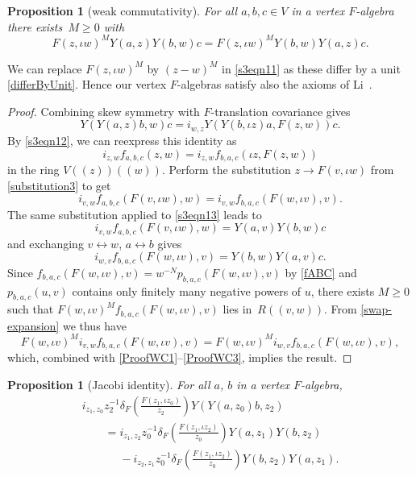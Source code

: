 \documentclass[pdftex]{sigma}
\numberwithin{equation}{section}
\newtheorem{Proposition}[Theorem]{Proposition}
\theoremstyle{definition}
\begin{document}
\begin{Proposition}[weak commutativity]
 For all $a,b,c\in V$ in a vertex $F$-algebra there exists~${M\geqslant0}$ with
\begin{equation}\label{s3eqn11}
 F(z,\iota w)^M Y(a,z)Y(b,w)c=F(z,\iota w)^M Y(b,w)Y(a,z)c.
\end{equation}
\end{Proposition}

We can replace $F(z,\iota w)^M$ by $(z-w)^M$ in \eqref{s3eqn11} as these differ by a unit \eqref{differByUnit}. Hence our vertex $F$-algebras satisfy also the axioms of Li~\cite{Li}.

\begin{proof}
 Combining skew symmetry with $F$-translation covariance gives
 \[
 Y(Y(a,z)b,w)c%
 =i_{w,z} Y(Y(b,\iota z)a,F(z,w))c.
 \]
 By \eqref{s3eqn12}, we can reexpress this identity as
 \begin{equation}
 \label{wcc-eqn}
 i_{z,w}f_{a,b,c}(z,w)= i_{z,w}f_{b,a,c}(\iota z,F(z,w))
 \end{equation}
 in the ring $V(\!( z)\!)(\!( w)\!)$. Perform the substitution $z\to F(v,\iota w)$ from \eqref{substitution3} to get
 \begin{equation}
 \label{ProofWC1}
 i_{v,w}f_{a,b,c}(F(v,\iota w),w)=i_{v,w}f_{b,a,c}(F(w,\iota v),v).
 \end{equation}
 The same substitution applied to \eqref{s3eqn13} leads to
 \begin{equation}
 \label{ProofWC2}
 i_{v,w}f_{a,b,c}(F(v,\iota w),w)=Y(a,v)Y(b,w)c
 \end{equation}
 and exchanging $v\leftrightarrow w$, $a\leftrightarrow b$ gives
 \begin{equation}
 \label{ProofWC3}
 i_{w,v}f_{b,a,c}(F(w,\iota v),v)=Y(b,w)Y(a,v)c.
 \end{equation}
 Since $f_{b,a,c}(F(w,\iota v),v)=w^{-N}p_{b,a,c}(F(w,\iota v),v)$ by \eqref{fABC} and $p_{b,a,c}(u,v)$ contains only finitely many negative powers of $u$, there exists $M\geqslant0$ such that $F(w,\iota v)^M f_{b,a,c}(F(w,\iota v),v)$ lies in~${R(\!( v,w)\!)}$. From \eqref{swap-expansion} we thus have
 \[
 F(w,\iota v)^M i_{v,w}f_{b,a,c}(F(w,\iota v),v) = F(w,\iota v)^M i_{w,v}f_{b,a,c}(F(w,\iota v),v),
 \]
 which, combined with \eqref{ProofWC1}--\eqref{ProofWC3}, implies the result.
\end{proof}

\begin{Proposition}[Jacobi identity]
For all $a$, $b$ in a vertex $F$-algebra,
\begin{gather*}
i_{z_1,z_0}z_2^{-1}\delta_F\left(\frac{F(z_1,\iota z_0)}{z_2}\right)Y(Y(a,z_0)b,z_2)\\
\qquad=i_{z_1,z_2}z_0^{-1}\delta_F\left(\frac{F(z_1,\iota z_2)}{z_0}\right)Y(a,z_1)Y(b,z_2)\\
\phantom{\qquad=}{}-i_{z_2,z_1}z_0^{-1}\delta_F\left(\frac{F(z_1,\iota z_2)}{z_0}\right)Y(b,z_2)Y(a,z_1).
\end{gather*}
\end{Proposition}
\end{document}
